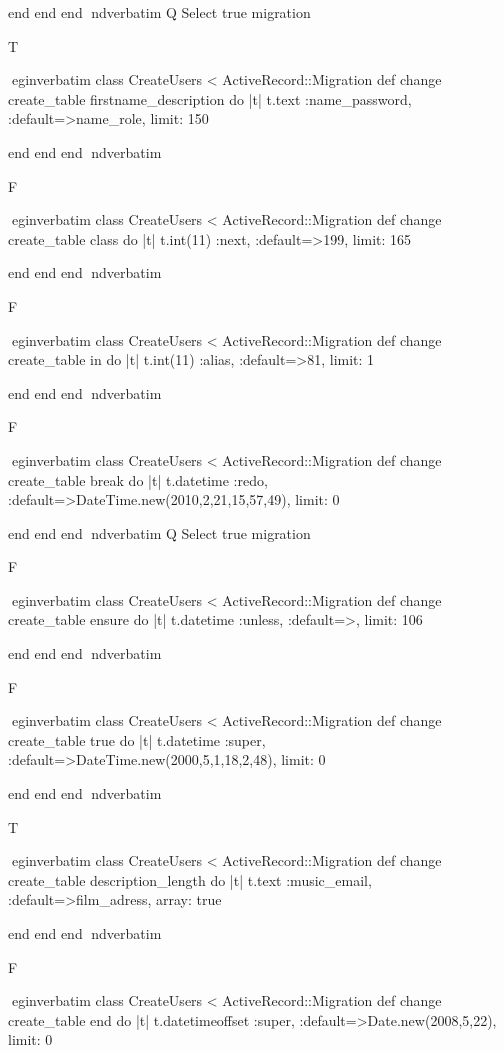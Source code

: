     end 
  end 
end
nd{verbatim}
Q
 Select true migration

T

egin{verbatim}
 class CreateUsers < ActiveRecord::Migration 
  def change 
    create_table firstname_description do |t| 
      t.text :name_password, :default=>name_role, limit: 150
    
    end 
  end 
end
nd{verbatim}

F

egin{verbatim}
 class CreateUsers < ActiveRecord::Migration 
  def change 
    create_table class do |t| 
      t.int(11) :next, :default=>199, limit: 165
    
    end 
  end 
end
nd{verbatim}

F

egin{verbatim}
 class CreateUsers < ActiveRecord::Migration 
  def change 
    create_table in do |t| 
      t.int(11) :alias, :default=>81, limit: 1
    
    end 
  end 
end
nd{verbatim}

F

egin{verbatim}
 class CreateUsers < ActiveRecord::Migration 
  def change 
    create_table break do |t| 
      t.datetime :redo, :default=>DateTime.new(2010,2,21,15,57,49), limit: 0
    
    end 
  end 
end
nd{verbatim}
Q
 Select true migration

F

egin{verbatim}
 class CreateUsers < ActiveRecord::Migration 
  def change 
    create_table ensure do |t| 
      t.datetime :unless, :default=>, limit: 106
    
    end 
  end 
end
nd{verbatim}

F

egin{verbatim}
 class CreateUsers < ActiveRecord::Migration 
  def change 
    create_table true do |t| 
      t.datetime :super, :default=>DateTime.new(2000,5,1,18,2,48), limit: 0
    
    end 
  end 
end
nd{verbatim}

T

egin{verbatim}
 class CreateUsers < ActiveRecord::Migration 
  def change 
    create_table description_length do |t| 
      t.text :music_email, :default=>film_adress, array: true
    
    end 
  end 
end
nd{verbatim}

F

egin{verbatim}
 class CreateUsers < ActiveRecord::Migration 
  def change 
    create_table end do |t| 
      t.datetimeoffset :super, :default=>Date.new(2008,5,22), limit: 0
    
